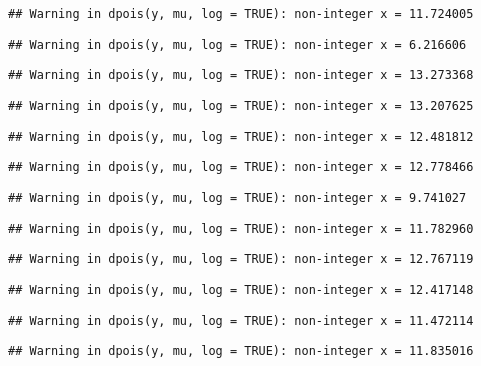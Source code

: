 \documentclass[
]{article}
\begin{document}
\begin{verbatim}
## Warning in dpois(y, mu, log = TRUE): non-integer x = 11.724005
\end{verbatim}

\begin{verbatim}
## Warning in dpois(y, mu, log = TRUE): non-integer x = 6.216606
\end{verbatim}

\begin{verbatim}
## Warning in dpois(y, mu, log = TRUE): non-integer x = 13.273368
\end{verbatim}

\begin{verbatim}
## Warning in dpois(y, mu, log = TRUE): non-integer x = 13.207625
\end{verbatim}

\begin{verbatim}
## Warning in dpois(y, mu, log = TRUE): non-integer x = 12.481812
\end{verbatim}

\begin{verbatim}
## Warning in dpois(y, mu, log = TRUE): non-integer x = 12.778466
\end{verbatim}

\begin{verbatim}
## Warning in dpois(y, mu, log = TRUE): non-integer x = 9.741027
\end{verbatim}

\begin{verbatim}
## Warning in dpois(y, mu, log = TRUE): non-integer x = 11.782960
\end{verbatim}

\begin{verbatim}
## Warning in dpois(y, mu, log = TRUE): non-integer x = 12.767119
\end{verbatim}

\begin{verbatim}
## Warning in dpois(y, mu, log = TRUE): non-integer x = 12.417148
\end{verbatim}

\begin{verbatim}
## Warning in dpois(y, mu, log = TRUE): non-integer x = 11.472114
\end{verbatim}

\begin{verbatim}
## Warning in dpois(y, mu, log = TRUE): non-integer x = 11.835016
\end{verbatim}
\end{document}
